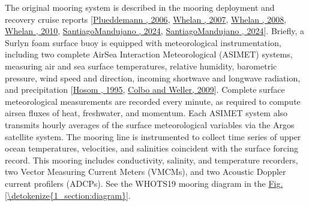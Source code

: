 \documentclass[a4paper,10pt,english,openany,oneside]{sphinxmanual}
\begin{document}
\sphinxAtStartPar
The original mooring system is described in the mooring deployment and recovery
cruise reports {[}\hyperlink{cite.references:id14}{Plueddemann , 2006}, \hyperlink{cite.references:id22}{Whelan , 2007}, \hyperlink{cite.references:id23}{Whelan , 2008}, \hyperlink{cite.references:id25}{Whelan , 2010}, \hyperlink{cite.references:id17}{Santiago\sphinxhyphen{}Mandujano , 2024}, \hyperlink{cite.references:id18}{Santiago\sphinxhyphen{}Mandujano , 2024}{]}.
Briefly, a Surlyn foam surface buoy is equipped with meteorological
instrumentation, including two complete Air\sphinxhyphen{}Sea Interaction Meteorological
(ASIMET) systems, measuring air and sea surface temperatures, relative humidity,
barometric pressure, wind speed and direction, incoming shortwave and longwave
radiation, and precipitation {[}\hyperlink{cite.references:id9}{Hosom , 1995}, \hyperlink{cite.references:id2}{Colbo and Weller, 2009}{]}. Complete surface
meteorological measurements are recorded every minute, as required to compute
air\sphinxhyphen{}sea fluxes of heat, freshwater, and momentum. Each ASIMET system also
transmits hourly averages of the surface meteorological variables via the Argos
satellite system. The mooring line is instrumented to collect time series of
upper ocean temperatures, velocities, and salinities coincident with the
surface forcing record. This mooring includes conductivity, salinity, and
temperature recorders, two Vector Measuring Current Meters (VMCMs), and two
Acoustic Doppler current profilers (ADCPs). See the WHOTS\sphinxhyphen{}19 mooring diagram in
the \hyperref[\detokenize{1_section:diagram}]{Fig.\@ \ref{\detokenize{1_section:diagram}}}.
\end{document}
